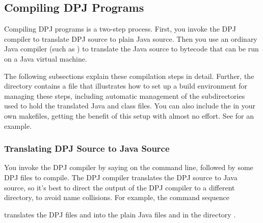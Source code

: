 \subsection{Compiling DPJ Programs}
\label{sec:invoking}

Compiling DPJ programs is a two-step process.  First, you invoke the
DPJ compiler  to translate DPJ source to plain Java source.
Then you use an ordinary Java compiler (such as ) to
translate the Java source to bytecode that can be run on a Java
virtual machine.

The following subsections explain these compilation steps in detail.
Further, the directory  contains a
file  that illustrates how to set up a build
environment for managing these steps, including automatic management
of the subdirectories used to hold the translated Java and class
files.  You can also include the  in your own
makefiles, getting the benefit of this setup with almost no effort.
See  for an example.

\subsubsection{Translating DPJ Source to Java Source}

You invoke the DPJ compiler by saying  on the command line,
followed by some DPJ files to compile.  The DPJ compiler translates
the DPJ source to Java source, so it's best to direct the output of
the DPJ compiler to a different directory, to avoid name collisions.
For example, the command sequence
%
\begin{description}
\item {}
\item {}
\end{description}
%
translates the DPJ files  and  into the
plain Java files  and  in the directory
.

